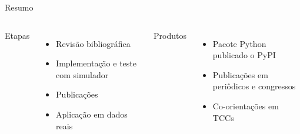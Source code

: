 \begin{frame}{Resumo}
    \begin{columns}
	    Etapas
	    \begin{itemize}
	        \item Revisão bibliográfica
	        \item Implementação e teste com simulador
	        \item Publicações
	        \item Aplicação em dados reais
	    \end{itemize}
	    
	    Produtos
	    \begin{itemize}
	        \item Pacote Python publicado o PyPI
	        \item Publicações em periôdicos e congressos
	        \item Co-orientações em TCCs
	    \end{itemize}
	\end{columns}
\end{frame}